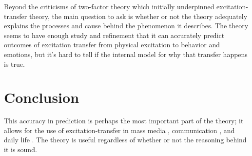 \documentclass[
  stu]{apa7}
\begin{document}
Beyond the criticisms of two-factor theory which initially underpinned
excitation-transfer theory, the main question to ask is whether or not
the theory adequately explains the processes and cause behind the
phenomenon it describes. The theory seems to have enough study and
refinement that it can accurately predict outcomes of excitation
transfer from physical excitation to behavior and emotions, but it's
hard to tell if the internal model for why that transfer happens is
true.

\hypertarget{conclusion}{%
\section{Conclusion}\label{conclusion}}

This accuracy in prediction is perhaps the most important part of the
theory; it allows for the use of excitation-transfer in mass media
\autocite{bryExcitationTransferTheoryThreeFactor,tanEmotionalArousalFacilitation},
communication \autocite{zilEffectResidualExcitation}, and daily life
\autocite{tanEmotionalArousalFacilitation}. The theory is useful
regardless of whether or not the reasoning behind it is sound.

\printbibliography
\end{document}
